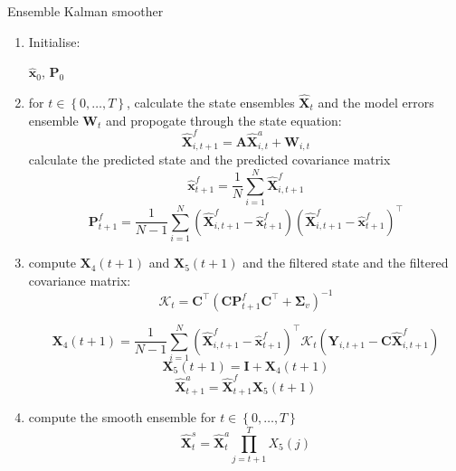 \documentclass[journal,a4paper]{IEEEtran}
\begin{document}

\begin{algorithm}
\caption{Ensemble Kalman smoother}
\label{alg:EnKS}
\begin{enumerate}
\item Initialise:
\begin{center}
 $\hat{\mathbf x}_0 $, $\mathbf P_0$  
\end{center}
\item
for $t\in\left\lbrace 0, \dots, T\right\rbrace $, calculate the state ensembles $\hat{\mathbf X}_t$ and the model errors ensemble $\mathbf W_t$ and propogate through the state equation:
\begin{equation*}
\hat{\mathbf X}_{i,t+1}^f=\mathbf A \hat{\mathbf X}_{i,t}^a+\mathbf W_{i,t}
\end{equation*}
calculate the predicted state and the predicted covariance matrix
\begin{equation*}
 \hat{\mathbf x}_{t+1}^f=\frac{1}{N}\sum_{i=1}^{N}\hat{\mathbf X}_{i,t+1}^f
\end{equation*}
\begin{equation*}
 \mathbf P_{t+1}^f=\frac{1}{N-1}\sum_{i=1}^{N}\left( \hat{\mathbf X}_{i,t+1}^f- \hat{\mathbf x}_{t+1}^f\right)\left( \hat{\mathbf X}_{i,t+1}^f- \hat{\mathbf x}_{t+1}^f\right)^\top
\end{equation*}
\item
compute $\mathbf X_4(t+1)$ and $\mathbf X_5(t+1)$ and the filtered state and the filtered covariance matrix:
\begin{equation*}
 \mathcal K_t=\mathbf C^{\top}(\mathbf C\mathbf{P}_{t+1}^f\mathbf C^{\top}+\boldsymbol\Sigma_v)^{-1}
\end{equation*}

\begin{equation*}
 \mathbf X_4(t+1)=\frac{1}{N-1}\sum_{i=1}^{N}(\hat{\mathbf X}_{i,t+1}^f-\hat{\mathbf x}^f_{t+1} )^\top\mathcal K_t (\mathbf Y_{i,t+1}-\mathbf C\hat{\mathbf{X}}_{i,t+1}^f)
\end{equation*}
\begin{equation*}
 \mathbf X_5(t+1)= \mathbf I +\mathbf X_4(t+1)
\end{equation*}
\begin{equation*}
 \hat{\mathbf X}_{t+1}^a=\hat{\mathbf X}_{t+1}^f \mathbf X_5(t+1)
\end{equation*}
\item compute the smooth ensemble for $t\in\left\lbrace 0, \dots, T\right\rbrace $
\begin{equation*}
 \hat{\mathbf{X}}_{t}^s=\hat{\mathbf X}_{t}^a \prod_{j=t+1}^{T}X_5(j)
\end{equation*}
\end{enumerate}
\end{algorithm}
\end{document}
